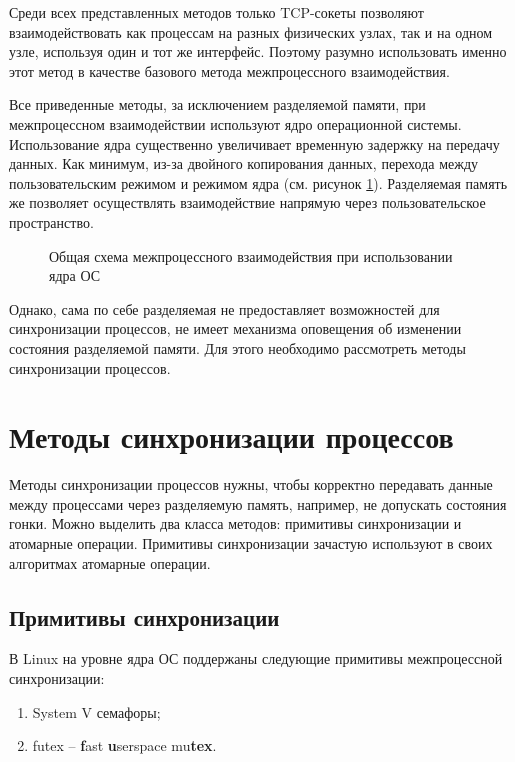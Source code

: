 Среди всех представленных методов только TCP-сокеты позволяют взаимодействовать как процессам на разных физических узлах, так и на одном узле, используя один и тот же интерфейс. Поэтому разумно использовать именно этот метод в качестве базового метода межпроцессного взаимодействия.

Все приведенные методы, за исключением разделяемой памяти, при межпроцессном взаимодействии используют ядро операционной системы. Использование ядра существенно увеличивает временную задержку на передачу данных. Как минимум, из-за двойного копирования данных, перехода между пользовательским режимом и режимом ядра (см. рисунок \ref{chapter11:KernelUsage}).
Разделяемая память же позволяет осуществлять взаимодействие напрямую через пользовательское пространство.

\begin{figure}[!h]
\caption{Общая схема межпроцессного взаимодействия при использовании ядра ОС}
\label{chapter11:KernelUsage}
\end{figure}

Однако, сама по себе разделяемая не предоставляет возможностей для синхронизации процессов, не имеет механизма оповещения об изменении состояния разделяемой памяти. Для этого необходимо рассмотреть методы синхронизации процессов.

\section{Методы синхронизации процессов}

Методы синхронизации процессов нужны, чтобы корректно передавать данные между процессами через разделяемую память, например, не допускать состояния гонки. Можно выделить два класса методов: примитивы синхронизации и атомарные операции. Примитивы синхронизации зачастую используют в своих алгоритмах атомарные операции.

\subsection{Примитивы синхронизации}

В Linux на уровне ядра ОС поддержаны следующие примитивы межпроцессной синхронизации:
\begin{enumerate}
\item System V семафоры;
\item futex -- \textbf{f}ast \textbf{u}serspace mu\textbf{tex}.
\end{enumerate}

